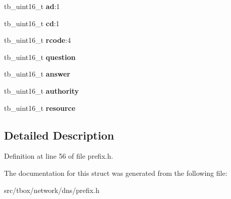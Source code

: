 \begin{DoxyCompactItemize}
\item 
\hypertarget{structtb__dns__header__t_a33cd3587dc6439e27ec8296f3eca96f2}{tb\-\_\-uint16\-\_\-t {\bfseries ad}\-:1}\label{structtb__dns__header__t_a33cd3587dc6439e27ec8296f3eca96f2}

\item 
\hypertarget{structtb__dns__header__t_adf658f253b3e931e11bf9f3ef85303d7}{tb\-\_\-uint16\-\_\-t {\bfseries cd}\-:1}\label{structtb__dns__header__t_adf658f253b3e931e11bf9f3ef85303d7}

\item 
\hypertarget{structtb__dns__header__t_a6212d0013d6e03f943a6bad70a468525}{tb\-\_\-uint16\-\_\-t {\bfseries rcode}\-:4}\label{structtb__dns__header__t_a6212d0013d6e03f943a6bad70a468525}

\item 
\hypertarget{structtb__dns__header__t_ac431f66ae2a902e08ef09c6d100ec707}{tb\-\_\-uint16\-\_\-t {\bfseries question}}\label{structtb__dns__header__t_ac431f66ae2a902e08ef09c6d100ec707}

\item 
\hypertarget{structtb__dns__header__t_a4eafb856135c6973c013b75e8c7faba7}{tb\-\_\-uint16\-\_\-t {\bfseries answer}}\label{structtb__dns__header__t_a4eafb856135c6973c013b75e8c7faba7}

\item 
\hypertarget{structtb__dns__header__t_a07f999a9d8689b64a2f6a17a8709ff90}{tb\-\_\-uint16\-\_\-t {\bfseries authority}}\label{structtb__dns__header__t_a07f999a9d8689b64a2f6a17a8709ff90}

\item 
\hypertarget{structtb__dns__header__t_ac787a45aee9ded94a5ef794125166937}{tb\-\_\-uint16\-\_\-t {\bfseries resource}}\label{structtb__dns__header__t_ac787a45aee9ded94a5ef794125166937}

\end{DoxyCompactItemize}


\subsection{Detailed Description}


Definition at line 56 of file prefix.\-h.



The documentation for this struct was generated from the following file\-:\begin{DoxyCompactItemize}
\item 
src/tbox/network/dns/prefix.\-h\end{DoxyCompactItemize}
